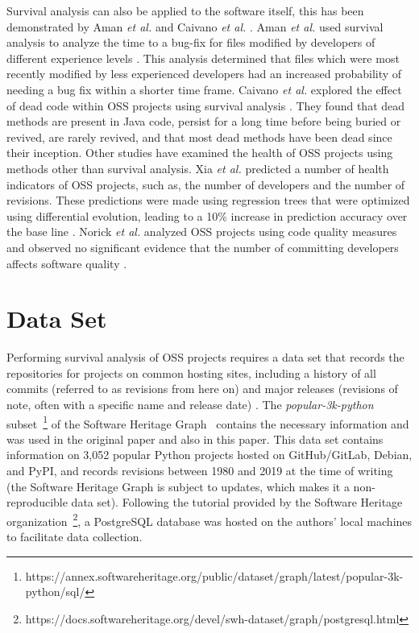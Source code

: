 \documentclass[sigconf,review]{acmart}
\begin{document}
Survival analysis can also be applied to the software itself, this has been demonstrated by Aman \emph{et al.} \cite{aman2017survival} and Caivano \emph{et al.} \cite{caivano2021exploratory}. 
Aman \emph{et al.} used survival analysis to analyze the time to a bug-fix for files modified by developers of different experience levels \cite{aman2017survival}. 
This analysis determined that files which were most recently modified by less experienced developers had an increased probability of needing a bug fix within a shorter time frame. 
Caivano \emph{et al.} explored the effect of dead code within OSS projects using survival analysis \cite{caivano2021exploratory}. 
They found that dead methods are present in Java code, persist for a long time before being buried or revived, are rarely revived, and that most dead methods have been dead since their inception. 
Other studies have examined the health of OSS projects using methods other than survival analysis. 
Xia \emph{et al.} predicted a number of health indicators of OSS projects, such as, the number of developers and the number of revisions.
These predictions were made using regression trees that were optimized using differential evolution, leading to a 10\% increase in prediction accuracy over the base line \cite{xia2020predicting}. 
Norick \emph{et al.} analyzed OSS projects using code quality measures and observed no significant evidence that the number of committing developers affects software quality \cite{norick2010effects}. 

\section{Data Set} \label{data}

Performing survival analysis of OSS projects requires a data set that records the repositories for projects on common hosting sites, including a history of all commits (referred to as revisions from here on) and major releases (revisions of note, often with a specific name and release date) \cite{ali2020cheating}. 
The \emph{popular-3k-python} subset~\footnote{https://annex.softwareheritage.org/public/dataset/graph/latest/popular-3k-python/sql/} of the Software Heritage Graph~\cite{pietri2019software} contains the necessary information and was used in the original paper and also in this paper.
This data set contains information on 3,052 popular Python projects hosted on GitHub/GitLab, Debian, and PyPI, and records revisions between 1980 and 2019 at the time of writing (the Software Heritage Graph is subject to updates, which makes it a non-reproducible data set).
Following the tutorial provided by the Software Heritage organization~\footnote{https://docs.softwareheritage.org/devel/swh-dataset/graph/postgresql.html}, a PostgreSQL database was hosted on the authors' local machines to facilitate data collection.
\end{document}
